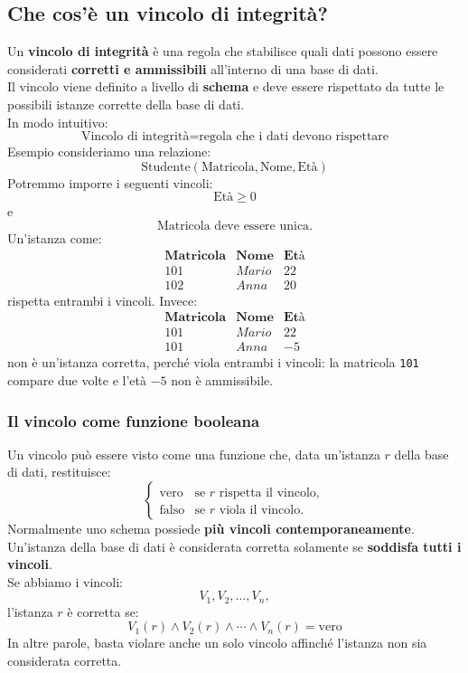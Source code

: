 \subsection{Che cos'è un vincolo di integrità?}
Un \textbf{vincolo di integrità} è una regola che stabilisce quali dati
possono essere considerati \textbf{corretti e ammissibili} all'interno
di una base di dati.\\
Il vincolo viene definito a livello di \textbf{schema} e deve essere
rispettato da tutte le possibili istanze corrette della base di dati.\\
In modo intuitivo:
\[
\boxed{
\text{Vincolo di integrità}
=
\text{regola che i dati devono rispettare}
}
\]
\textcolor{verdeEsempio}{Esempio} consideriamo una relazione:
\[
\text{Studente}(\text{Matricola},\text{Nome},\text{Età})
\]
Potremmo imporre i seguenti vincoli:
\[
\text{Età} \geq 0
\]
e
\[
\text{Matricola deve essere unica}.
\]
Un'istanza come:
\[
\begin{array}{c|c|c}
\textbf{Matricola} & \textbf{Nome} & \textbf{Età} \\ \hline
101 & Mario & 22 \\
102 & Anna & 20
\end{array}
\]
rispetta entrambi i vincoli.
Invece:
\[
\begin{array}{c|c|c}
\textbf{Matricola} & \textbf{Nome} & \textbf{Età} \\ \hline
101 & Mario & 22 \\
101 & Anna & -5
\end{array}
\]
non è un'istanza corretta, perché viola entrambi i vincoli:
la matricola \texttt{101} compare due volte e l'età $-5$ non è
ammissibile.
\subsubsection{Il vincolo come funzione booleana}
Un vincolo può essere visto come una funzione che, data un'istanza
$r$ della base di dati, restituisce:
\[
\boxed{
\begin{cases}
\text{vero} & \text{se } r \text{ rispetta il vincolo},\\
\text{falso} & \text{se } r \text{ viola il vincolo}.
\end{cases}
}
\]
Normalmente uno schema possiede \textbf{più vincoli contemporaneamente}.
Un'istanza della base di dati è considerata corretta solamente se
\textbf{soddisfa tutti i vincoli}.\\
Se abbiamo i vincoli:
\[
V_1,V_2,\ldots,V_n,
\]
l'istanza $r$ è corretta se:
\[
\boxed{
V_1(r) \land V_2(r) \land \cdots \land V_n(r)
=
\text{vero}
}
\]
In altre parole, basta violare anche un solo vincolo affinché
l'istanza non sia considerata corretta.

